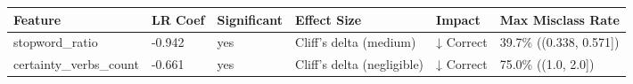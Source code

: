 \begin{tabular}{llllll}
\toprule
Feature & LR Coef & Significant & Effect Size & Impact & Max Misclass Rate \\
\midrule
stopword\_ratio & -0.942 & yes & Cliff's delta (medium) & ↓ Correct & 39.7\% ((0.338, 0.571]) \\
certainty\_verbs\_count & -0.661 & yes & Cliff's delta (negligible) & ↓ Correct & 75.0\% ((1.0, 2.0]) \\
\bottomrule
\end{tabular}
